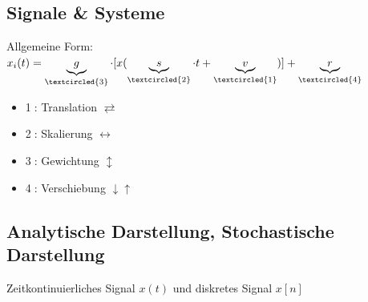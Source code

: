 \documentclass[6pt,a4paper]{scrartcl}
\begin{document}
\begin{multicols}{4}
	\subsection{Signale \& Systeme}
	Allgemeine Form: $x_i(t) = \underbrace{g}_{\textcircled{3}} \cdot [x(\underbrace{s}_{\textcircled{2}} \cdot t + \underbrace{v}_{\textcircled{1}})] + \underbrace{r}_{\textcircled{4}}$
	\begin{itemize}
		\item \textcircled{1}: Translation $\rightleftarrows$
		\item \textcircled{2}: Skalierung $\longleftrightarrow$
		\item \textcircled{3}: Gewichtung $\updownarrow$
		\item \textcircled{4}: Verschiebung $\downarrow\uparrow$
	\end{itemize}
	
	\subsection{Analytische Darstellung, Stochastische Darstellung}
	Zeitkontinuierliches Signal $x(t)$ und diskretes Signal $x[n]$\\
	

\end{multicols}
\end{document}
